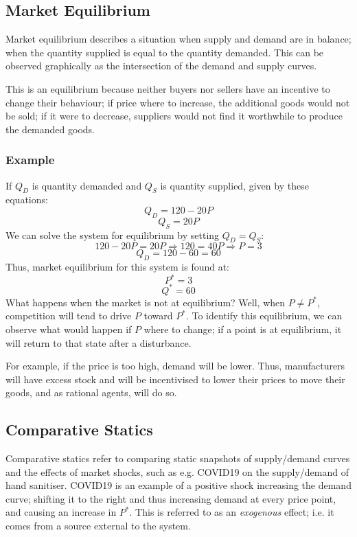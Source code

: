 \documentclass[12pt]{report}
\begin{document}
\subsection*{Market Equilibrium}
Market equilibrium describes a situation when supply and demand are in balance; when the 
quantity supplied is equal to the quantity demanded. This can be observed graphically as
the intersection of the demand and supply curves. 

\bigskip
This is an equilibrium because neither buyers
nor sellers have an incentive to change their behaviour; if price where to increase, the
additional goods would not be sold; if it were to decrease, suppliers would not find it
worthwhile to produce the demanded goods.

\subsubsection*{Example}
If \(Q_D\) is quantity demanded and \(Q_S\) is quantity supplied, given by these equations:
\[Q_D = 120 - 20P\]
\[Q_S = 20P\]
We can solve the system for equilibrium by setting \(Q_D = Q_S\):
\[120 - 20P = 20P \Rightarrow 120 = 40P \Rightarrow P = 3\]
\[Q_D = 120 - 60 = 60\]
Thus, market equilibrium for this system is found at:
\[P^* = 3\]
\[Q^* = 60\]
What happens when the market is not at equilibrium? Well, when \(P \neq P^*\),
competition will tend to drive \(P\) toward \(P^*\). To identify this equilibrium,
we can observe what would happen if \(P\) where to change; if a point is at equilibrium,
it will return to that state after a disturbance.

\bigskip
For example, if the price is too high, demand will be lower. Thus, manufacturers will
have excess stock and will be incentivised to lower their prices to move their goods,
and as rational agents, will do so.

\subsection*{Comparative Statics}
Comparative statics refer to comparing static snapshots of supply/demand curves
and the effects of market shocks, such as e.g. COVID19 on the supply/demand of hand sanitiser.
COVID19 is an example of a positive shock increasing the demand curve; shifting it to the right and 
thus increasing demand at every price point, and causing an increase in \(P^*\). This is referred to as an \textit{exogenous} effect;
i.e. it comes from a source external to the system.
\end{document}
